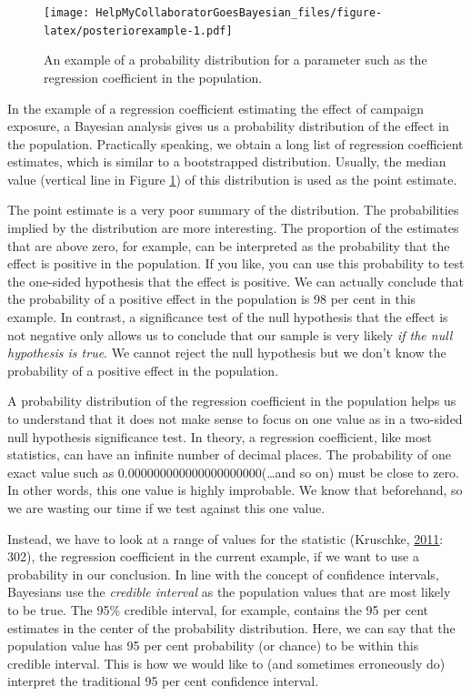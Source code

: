 \documentclass[doc]{apa6}
\begin{document}
\begin{figure}
\centering
\texttt{[image: HelpMyCollaboratorGoesBayesian\_files/figure-latex/posteriorexample-1.pdf]}
\caption{\label{fig:posteriorexample}An example of a probability
distribution for a parameter such as the regression coefficient in the
population.}
\end{figure}

In the example of a regression coefficient estimating the effect of
campaign exposure, a Bayesian analysis gives us a probability
distribution of the effect in the population. Practically speaking, we
obtain a long list of regression coefficient estimates, which is similar
to a bootstrapped distribution. Usually, the median value (vertical line
in Figure \ref{fig:posteriorexample}) of this distribution is used as
the point estimate.

The point estimate is a very poor summary of the distribution. The
probabilities implied by the distribution are more interesting. The
proportion of the estimates that are above zero, for example, can be
interpreted as the probability that the effect is positive in the
population. If you like, you can use this probability to test the
one-sided hypothesis that the effect is positive. We can actually
conclude that the probability of a positive effect in the population is
98 per cent in this example. In contrast, a significance test of the
null hypothesis that the effect is not negative only allows us to
conclude that our sample is very likely \emph{if the null hypothesis is
true}. We cannot reject the null hypothesis but we don't know the
probability of a positive effect in the population.

A probability distribution of the regression coefficient in the
population helps us to understand that it does not make sense to focus
on one value as in a two-sided null hypothesis significance test. In
theory, a regression coefficient, like most statistics, can have an
infinite number of decimal places. The probability of one exact value
such as 0.000000000000000000000(\ldots{}and so on) must be close to
zero. In other words, this one value is highly improbable. We know that
beforehand, so we are wasting our time if we test against this one
value.

Instead, we have to look at a range of values for the statistic
(Kruschke,
\protect\hyperlink{ref-kruschkeBayesianAssessmentNull2011}{2011}: 302),
the regression coefficient in the current example, if we want to use a
probability in our conclusion. In line with the concept of confidence
intervals, Bayesians use the \emph{credible interval} as the population
values that are most likely to be true. The 95\% credible interval, for
example, contains the 95 per cent estimates in the center of the
probability distribution. Here, we can say that the population value has
95 per cent probability (or chance) to be within this credible interval.
This is how we would like to (and sometimes erroneously do) interpret
the traditional 95 per cent confidence interval.
\end{document}
